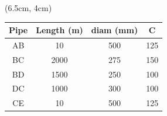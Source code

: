 \documentclass[9pt,xcolor={svgnames, x11names},mathpazo, professionalfonts]{beamer}
\begin{document}
\begin{frame}
	\begin{textblock*}{.35\textwidth}(6.5cm, 4cm)
		\centering
		\footnotesize
		\begin{tabular}{cccc}
			\toprule
			Pipe & Length (m) & diam (mm) & C   \\
			\midrule
			AB   & 10         & 500       & 125 \\
			\midrule
			BC   & 2000       & 275       & 150 \\
			\midrule
			BD   & 1500       & 250       & 100 \\
			\midrule
			DC   & 1000       & 300       & 100 \\
			\midrule
			CE   & 10         & 500       & 125 \\
			\bottomrule
		\end{tabular}
	\end{textblock*}
	
	
\end{frame}
\end{document}
